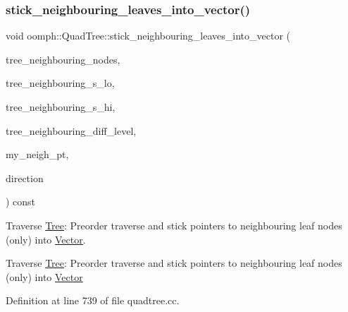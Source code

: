 \mbox{\label{classoomph_1_1QuadTree_a34650b024e8d355a117f486d18ab2062}} 
\subsubsection{\texorpdfstring{stick\+\_\+neighbouring\+\_\+leaves\+\_\+into\+\_\+vector()}{stick\_neighbouring\_leaves\_into\_vector()}}
{\footnotesize\ttfamily void oomph\+::\+Quad\+Tree\+::stick\+\_\+neighbouring\+\_\+leaves\+\_\+into\+\_\+vector (\begin{DoxyParamCaption}\item[{\hyperlink{classoomph_1_1Vector}{Vector}$<$ const \hyperlink{classoomph_1_1QuadTree}{Quad\+Tree} $\ast$$>$ \&}]{tree\+\_\+neighbouring\+\_\+nodes,  }\item[{\hyperlink{classoomph_1_1Vector}{Vector}$<$ \hyperlink{classoomph_1_1Vector}{Vector}$<$ double $>$ $>$ \&}]{tree\+\_\+neighbouring\+\_\+s\+\_\+lo,  }\item[{\hyperlink{classoomph_1_1Vector}{Vector}$<$ \hyperlink{classoomph_1_1Vector}{Vector}$<$ double $>$ $>$ \&}]{tree\+\_\+neighbouring\+\_\+s\+\_\+hi,  }\item[{\hyperlink{classoomph_1_1Vector}{Vector}$<$ int $>$ \&}]{tree\+\_\+neighbouring\+\_\+diff\+\_\+level,  }\item[{const \hyperlink{classoomph_1_1QuadTree}{Quad\+Tree} $\ast$}]{my\+\_\+neigh\+\_\+pt,  }\item[{const int \&}]{direction }\end{DoxyParamCaption}) const}



Traverse \hyperlink{classoomph_1_1Tree}{Tree}\+: Preorder traverse and stick pointers to neighbouring leaf nodes (only) into \hyperlink{classoomph_1_1Vector}{Vector}. 

Traverse \hyperlink{classoomph_1_1Tree}{Tree}\+: Preorder traverse and stick pointers to neighbouring leaf nodes (only) into \hyperlink{classoomph_1_1Vector}{Vector} 

Definition at line 739 of file quadtree.\+cc.



